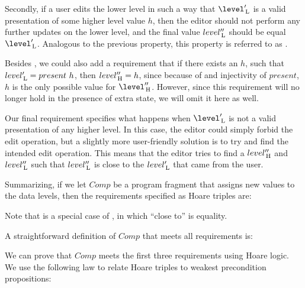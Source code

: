 Secondly, if a user edits the lower level in such a way that $\level'\L$ is a valid presentation of some higher level value $h$, then the editor should not perform any further updates on the lower level, and the final value $level''_{\, \mathrm L}$ should be equal $\level'\L$. Analogous to the previous property, this property is referred to as .

Besides , we could also add a requirement that if there exists an $h$, such that $level'_{\, \mathrm L} = present~h$, then $level''_{\, \mathrm H} = h$, since because of  and injectivity of $present$, $h$ is the only possible value for $\level''\H$. However, since this requirement will no longer hold in the presence of extra state, we will omit it here as well.

Our final requirement specifies what happens when $\level'\L$ is not a valid presentation of any higher level. In this case, the editor could simply forbid the edit operation, but a slightly more user-friendly solution is to try and find the intended edit operation. This means that the editor tries to find a $level''_{\, \mathrm H}$ and $level''_{\, \mathrm L}$ such that $level''_{\, \mathrm L}$ is close to the $level'_{\, \mathrm L}$ that came from the user. 

Summarizing, if we let $Comp$ be a program fragment that assigns new values to the data levels, then the requirements specified as Hoare triples are:


Note that  is a special case of , in which ``close to'' is equality.


A straightforward definition of $Comp$ that meets all requirements is:


We can prove that $Comp$ meets the first three requirements using Hoare logic. We use the following law to relate Hoare triples to weakest precondition propositions: 

